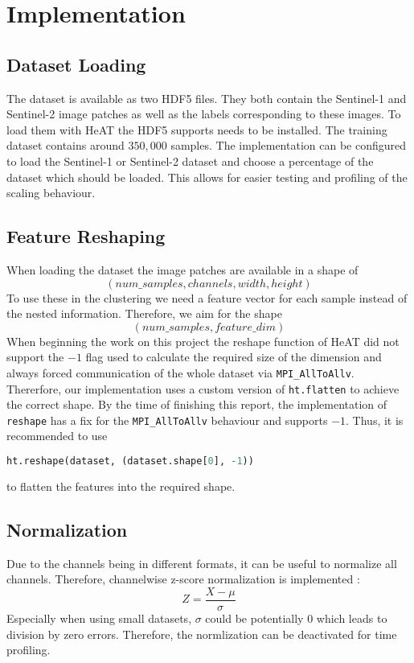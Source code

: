 \section{Implementation}
\label{sec:implementation}

\subsection{Dataset Loading}
\label{subsec:dataset_loading}
The dataset is available as two HDF5 files. They both contain the Sentinel-1 and Sentinel-2 image patches as well as the labels
corresponding to these images.
To load them with \gls{HeAT} the HDF5 supports needs to be installed.
The training dataset contains around \(350,000\) samples. The implementation can be configured to load
the Sentinel-1 or Sentinel-2 dataset and choose a percentage of the dataset which should be loaded.
This allows for easier testing and profiling of the scaling behaviour.


\subsection{Feature Reshaping}
\label{subsec:feature_reshaping}
When loading the dataset the image patches are available in a shape of \[(num\_samples, channels, width, height)\]
To use these in the clustering we need a feature vector for each sample instead of the nested information. Therefore,
we aim for the shape \[(num\_samples, feature\_dim)\]
When beginning the work on this project the reshape function of \gls{HeAT} did not support the \(-1\) flag used to
calculate the required size of the dimension and always forced communication of the whole dataset via \lstinline{MPI_AllToAllv}.
Thererfore, our implementation uses a custom version of \lstinline{ht.flatten} to achieve the correct shape.
By the time of finishing this report, the implementation of \lstinline{reshape} has a fix for the \lstinline{MPI_AllToAllv} behaviour and supports \(-1\).
Thus, it is recommended to use \begin{lstlisting}[language=Python]
    ht.reshape(dataset, (dataset.shape[0], -1))
\end{lstlisting}
to flatten the features into the required shape.

\subsection{Normalization}
\label{subsec:normalization}
Due to the channels being in different formats, it can be useful to normalize all channels.
Therefore, channelwise z-score normalization is implemented \cite{wooldridge_introductory_2012}:
\[Z = \frac{X - \mu}{\sigma}\]
Especially when using small datasets, \(\sigma\) could be potentially \(0\) which leads to division by zero errors.
Therefore, the normlization can be deactivated for time profiling.

